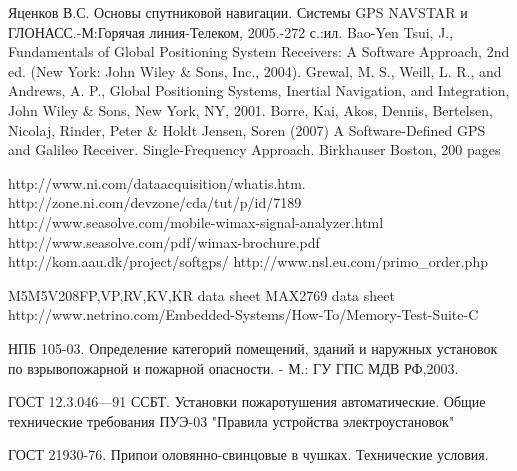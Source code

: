 
\begin{thebibliography}{99}
 Яценков В.С. Основы спутниковой навигации. Системы GPS NAVSTAR и ГЛОНАСС.-М:Горячая линия-Телеком, 2005.-272 с.:ил.
 Bao-Yen Tsui, J., Fundamentals of Global Positioning System Receivers: A Software Approach, 2nd ed. (New York: John Wiley \& Sons, Inc., 2004).
 Grewal, M. S., Weill, L. R., and Andrews, A. P., Global Positioning Systems, Inertial Navigation, and Integration, John Wiley \& Sons, New York, NY, 2001.
 Borre, Kai, Akos, Dennis, Bertelsen, Nicolaj, Rinder, Peter \& Holdt Jensen, Soren (2007) A Software-Defined GPS and Galileo Receiver. Single-Frequency Approach. Birkhauser Boston, 200 pages

 http://www.ni.com/dataacquisition/whatis.htm.
 http://zone.ni.com/devzone/cda/tut/p/id/7189
 http://www.seasolve.com/mobile-wimax-signal-analyzer.html
 http://www.seasolve.com/pdf/wimax-brochure.pdf
 http://kom.aau.dk/project/softgps/
 http://www.nsl.eu.com/primo\_order.php

 M5M5V208FP,VP,RV,KV,KR data sheet
 MAX2769 data sheet
 http://www.netrino.com/Embedded-Systems/How-To/Memory-Test-Suite-C

 НПБ 105-03. Определение категорий помещений, зданий и наружных установок по
взрывопожарной и пожарной опасности. - М.: ГУ ГПС МДВ РФ,2003.

 ГОСТ 12.3.046—91 ССБТ. Установки пожаротушения автоматические. Общие технические требования 
 ПУЭ-03 "Правила устройства электроустановок"

 ГОСТ 21930-76. Припои оловянно-свинцовые в чушках. Технические условия.
\end{thebibliography}
